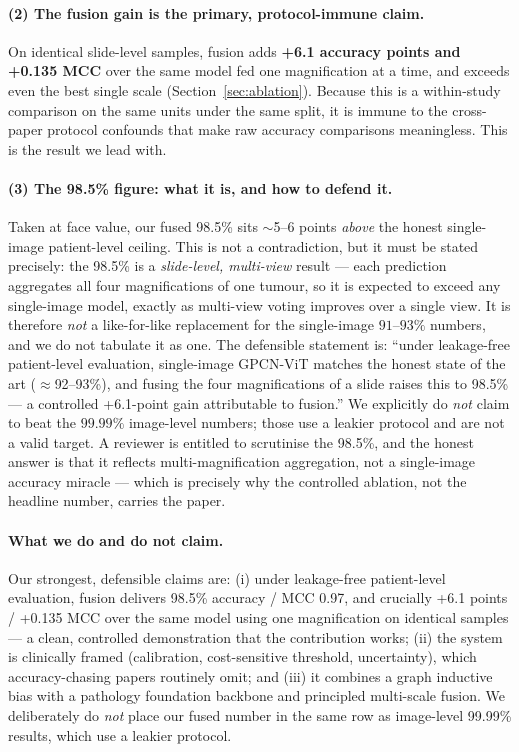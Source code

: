 \documentclass[11pt]{article}
\begin{document}
\paragraph{(2) The fusion gain is the primary, protocol-immune claim.} On identical
slide-level samples, fusion adds \textbf{+6.1 accuracy points and +0.135 MCC} over
the same model fed one magnification at a time, and exceeds even the best single
scale (Section~\ref{sec:ablation}). Because this is a within-study comparison on the
same units under the same split, it is immune to the cross-paper protocol
confounds that make raw accuracy comparisons meaningless. This is the result we
lead with.

\paragraph{(3) The 98.5\% figure: what it is, and how to defend it.} Taken at face
value, our fused 98.5\% sits $\sim$5--6 points \emph{above} the honest
single-image patient-level ceiling. This is not a contradiction, but it must be
stated precisely: the 98.5\% is a \emph{slide-level, multi-view} result — each
prediction aggregates all four magnifications of one tumour, so it is expected to
exceed any single-image model, exactly as multi-view voting improves over a single
view. It is therefore \emph{not} a like-for-like replacement for the single-image
$91$--$93\%$ numbers, and we do not tabulate it as one. The defensible statement is:
``under leakage-free patient-level evaluation, single-image GPCN-ViT matches the
honest state of the art ($\approx$92--93\%), and fusing the four magnifications of a
slide raises this to 98.5\% — a controlled +6.1-point gain attributable to fusion.''
We explicitly do \emph{not} claim to beat the $99.99\%$ image-level numbers; those
use a leakier protocol and are not a valid target. A reviewer is entitled to
scrutinise the 98.5\%, and the honest answer is that it reflects multi-magnification
aggregation, not a single-image accuracy miracle — which is precisely why the
controlled ablation, not the headline number, carries the paper.

\paragraph{What we do and do not claim.} Our strongest, defensible claims are:
(i) under leakage-free patient-level evaluation, fusion delivers 98.5\% accuracy /
MCC 0.97, and crucially \mbox{+6.1} points / \mbox{+0.135} MCC over the same model
using one magnification on identical samples — a clean, controlled demonstration
that the contribution works; (ii) the system is clinically framed (calibration,
cost-sensitive threshold, uncertainty), which accuracy-chasing papers routinely
omit; and (iii) it combines a graph inductive bias with a pathology foundation
backbone and principled multi-scale fusion. We deliberately do \emph{not} place our
fused number in the same row as image-level 99.99\% results, which use a leakier
protocol.
\end{document}
